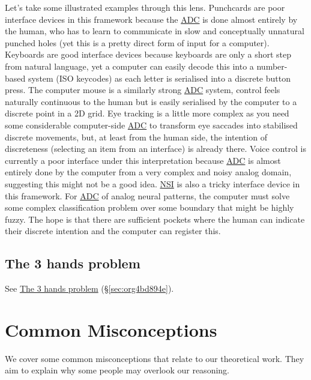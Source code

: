 \documentclass[logo,bsc,singlespacing,parskip]{infthesis}
\begin{document}
Let's take some illustrated examples through this lens.
Punchcards are poor interface devices in this framework because the \hyperref[org44fccbb]{ADC} is done almost entirely by the human, who has to learn to communicate in slow and conceptually unnatural punched holes (yet this is a pretty direct form of input for a computer).
Keyboards are good interface devices because keyboards are only a short step from natural language, yet a computer can easily decode this into a number-based system (ISO keycodes) as each letter is serialised into a discrete button press.
The computer mouse is a similarly strong \hyperref[org44fccbb]{ADC} system, control feels naturally continuous to the human but is easily serialised by the computer to a discrete point in a 2D grid.
Eye tracking is a little more complex as you need some considerable computer-side \hyperref[org44fccbb]{ADC} to transform eye saccades into stabilised discrete movements, but, at least from the human side, the intention of discreteness (selecting an item from an interface) is already there.
Voice control is currently a poor interface under this interpretation because \hyperref[org44fccbb]{ADC} is almost entirely done by the computer from a very complex and noisy analog domain, suggesting this might not be a good idea.
\hyperref[orgf403bf3]{NSI} is also a tricky interface device in this framework.
For \hyperref[org44fccbb]{ADC} of analog neural patterns, the computer must solve some complex classification problem over some boundary that might be highly fuzzy.
The hope is that there are sufficient pockets where the human can indicate their discrete intention and the computer can register this.

\section{The 3 hands problem}
\label{sec:org6ab8aab}

See \hyperref[sec:org4bd894e]{The 3 hands problem} (\S \ref{sec:org4bd894e}).
\chapter{Common Misconceptions}
\label{sec:org650adbc}
We cover some common misconceptions that relate to our theoretical work.
They aim to explain why some people may overlook our reasoning.
\end{document}
